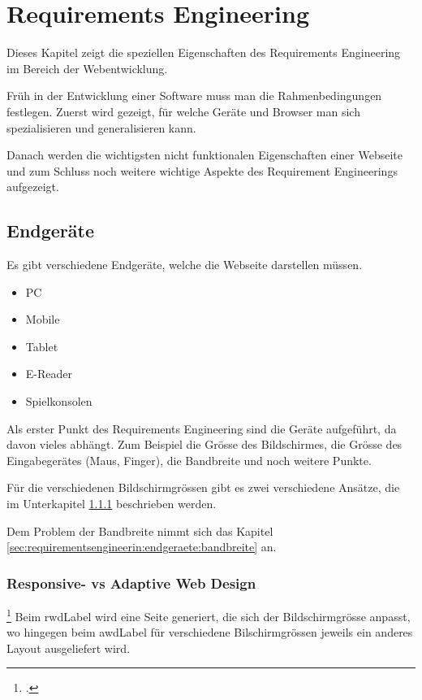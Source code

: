 \setcounter{secnumdepth}{3}
\chapter{Requirements Engineering}
\label{sec:requirementsengineering}
Dieses Kapitel zeigt die speziellen Eigenschaften des Requirements Engineering im Bereich der Webentwicklung.

Früh in der Entwicklung einer Software muss man die Rahmenbedingungen festlegen. Zuerst wird gezeigt, für welche Geräte und Browser man sich spezialisieren und generalisieren kann. 

Danach werden die wichtigsten nicht funktionalen Eigenschaften einer Webseite und zum Schluss noch weitere wichtige Aspekte des Requirement Engineerings aufgezeigt.

\section{Endgeräte}
Es gibt verschiedene Endgeräte, welche die Webseite darstellen müssen. 
\begin{itemize}
\item PC
\item Mobile
\item Tablet
\item E-Reader
\item Spielkonsolen
\end{itemize}

Als erster Punkt des Requirements Engineering sind die Geräte aufgeführt, da davon vieles abhängt. Zum Beispiel die Grösse des Bildschirmes, die Grösse des Eingabegerätes (Maus, Finger), die Bandbreite und noch weitere Punkte.

Für die verschiedenen Bildschirmgrössen gibt es zwei verschiedene Ansätze, die im Unterkapitel \ref{sec:requirementsengineerin:endgeraete:responsivevsadaptive}  beschrieben werden.

Dem Problem der Bandbreite nimmt sich das Kapitel \ref{sec:requirementsengineerin:endgeraete:bandbreite}  an.

\subsection{Responsive- vs Adaptive Web Design}
\label{sec:requirementsengineerin:endgeraete:responsivevsadaptive}
\footcite{Responsive_vs_Adaptive_Design_2015-05-31}
Beim \gls{rwdLabel} wird eine Seite generiert, die sich der Bildschirmgrösse anpasst, wo hingegen beim \gls{awdLabel} für verschiedene Bilschirmgrössen jeweils ein anderes Layout ausgeliefert wird.


